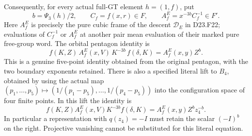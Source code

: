 Consequently, for every actual full-GT element $h=(1,f)$, put
\[
 b=\Psi_3(h)/2,\qquad C_f=f(x,r)\in F,
 \qquad A^E_f=x^{-3b}C_f^{-1}\in F'.
\]
Here $A^E_f$ is precisely the pure cubic frame of the descent
$\mathcal D_E$ in D23.F22; evaluations of $C_f^{-1}$ or $A^E_f$
at another pair mean evaluation of their marked pure free-group
word. The orbital pentagon identity is
\[
 \boxed{\quad
 f(K,Z)\,A^E_f(x,V)\,K^{-3b}\,f(\delta,K)
                  =A^E_f(x,y)Z^b.
 \quad}
\tag{D23.C16.6}
\]
This is a genuine five-point identity obtained from the original
pentagon, with the two boundary exponents retained.
There is also a specified literal lift to $B_4$, obtained by using
the actual map $(p_1,\ldots,p_5)\mapsto
(1/(p_1-p_5),\ldots,1/(p_4-p_5))$ into the configuration space
of four finite points. In this lift the identity is
\[
 f(K,Z)A^E_f(x,V)K^{-3b}f(\delta,K)
                   =A^E_f(x,y)Z^b z_4^{-b}.
\tag{D23.C16.6L}
\]
In particular a representation with $q(z_4)=-I$ must retain
the scalar $(-I)^b$ on the right. Projective vanishing cannot
be substituted for this literal equation.

